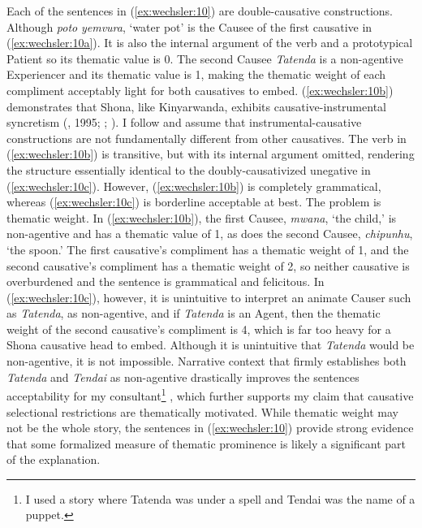 \documentclass[output=paper]{langscibook}
\begin{document}
Each of the sentences in (\ref{ex:wechsler:10}) are double-causative constructions. Although \textit{poto} \textit{yemvura}, ‘water pot’ is the Causee of the first causative in (\ref{ex:wechsler:10a}). It is also the internal argument of the verb and a prototypical Patient so its thematic value is 0. The second Causee \textit{Tatenda} is a non-agentive Experiencer and its thematic value is 1, making the thematic weight of each compliment acceptably light for both causatives to embed. (\ref{ex:wechsler:10b}) demonstrates that Shona, like Kinyarwanda, exhibits causative-instrumental syncretism (\citealt{Kimenyi1980}, 1995; \citealt{Peterson2007}; \citealt{Jerro2013}). I follow \citet{Jerro2013} and assume that instrumental-causative constructions are not fundamentally different from other causatives. The verb in (\ref{ex:wechsler:10b}) is transitive, but with its internal argument omitted, rendering the structure essentially identical to the doubly-causativized unegative in (\ref{ex:wechsler:10c}). However, (\ref{ex:wechsler:10b}) is completely grammatical, whereas (\ref{ex:wechsler:10c}) is borderline acceptable at best. The problem is thematic weight. In (\ref{ex:wechsler:10b}), the first Causee, \textit{mwana}, ‘the child,’ is non-agentive and has a thematic value of 1, as does the second Causee, \textit{chipunhu}, ‘the spoon.’ The first causative’s compliment has a thematic weight of 1, and the second causative’s compliment has a thematic weight of 2, so neither causative is overburdened and the sentence is grammatical and felicitous. In (\ref{ex:wechsler:10c}), however, it is unintuitive to interpret an animate Causer such as \textit{Tatenda}, as non-agentive, and if \textit{Tatenda} is an Agent, then the thematic weight of the second causative’s compliment is 4, which is far too heavy for a Shona causative head to embed. Although it is unintuitive that \textit{Tatenda} would be non-agentive, it is not impossible. Narrative context that firmly establishes both \textit{Tatenda} and \textit{Tendai} as non-agentive drastically improves the sentences acceptability for my consultant\footnote{I used a story where Tatenda was under a spell and Tendai was the name of a puppet.} , which further supports my claim that causative selectional restrictions are thematically motivated. While thematic weight may not be the whole story, the sentences in (\ref{ex:wechsler:10}) provide strong evidence that some formalized measure of thematic prominence is likely a significant part of the explanation.\\
\end{document}
